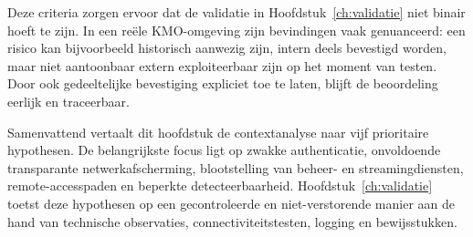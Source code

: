 Deze criteria zorgen ervoor dat de validatie in Hoofdstuk~\ref{ch:validatie} niet binair hoeft te zijn. In een reële KMO-omgeving zijn bevindingen vaak genuanceerd: een risico kan bijvoorbeeld historisch aanwezig zijn, intern deels bevestigd worden, maar niet aantoonbaar extern exploiteerbaar zijn op het moment van testen. Door ook gedeeltelijke bevestiging expliciet toe te laten, blijft de beoordeling eerlijk en traceerbaar.

Samenvattend vertaalt dit hoofdstuk de contextanalyse naar vijf prioritaire hypothesen. De belangrijkste focus ligt op zwakke authenticatie, onvoldoende transparante netwerkafscherming, blootstelling van beheer- en streamingdiensten, remote-accesspaden en beperkte detecteerbaarheid. Hoofdstuk~\ref{ch:validatie} toetst deze hypothesen op een gecontroleerde en niet-verstorende manier aan de hand van technische observaties, connectiviteitstesten, logging en bewijsstukken.
